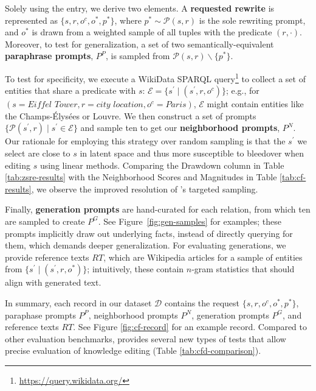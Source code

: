 Solely using the \pararel entry, we derive two elements. A \textbf{requested rewrite} is represented as $\{s, r, o^c, o^*, p^* \}$, where $p^* \sim\mathcal{P}(s, r)$ is the sole rewriting prompt, and $o^*$ is drawn from a weighted sample of all \pararel tuples with the predicate $(r, \cdot)$.
Moreover, to test for generalization, a set of two semantically-equivalent \textbf{paraphrase prompts}, $P^P$, is sampled from $\mathcal{P}(s,r) \backslash \{p^*\}$.

To test for specificity, we execute a WikiData SPARQL query\footnote{\url{https://query.wikidata.org/}} to collect a set of entities that share a predicate with $s$: $\mathcal{E} =\{ s^\prime \mid (s^\prime, r, o^c) \}$; e.g., for $(s=\textit{Eiffel Tower}, r=\textit{city location}, o^c=\textit{Paris})$, $\mathcal{E}$ might contain entities like the Champs-Élysées or Louvre. We then construct a set of prompts $\{\mathcal{P}(s^\prime, r) \mid s^\prime \in \mathcal{E}\}$ and sample ten to get our \textbf{neighborhood prompts}, $P^N$. Our rationale for employing this strategy over random sampling is that the $s^\prime$ we select are close to $s$ in latent space and thus more susceptible to bleedover when editing $s$ using linear methods. Comparing the Drawdown column in Table \ref{tab:zsre-results} with the Neighborhood Scores and Magnitudes in Table \ref{tab:cf-results}, we observe the improved resolution of \cfd's targeted sampling.


Finally, \textbf{generation prompts} are hand-curated for each relation, from which ten are sampled to create $P^G$. See Figure~\ref{fig:gen-samples} for examples; these prompts implicitly draw out underlying facts, instead of directly querying for them, which demands deeper generalization. For evaluating generations, we provide reference texts $RT$, which are Wikipedia articles for a sample of entities from $\{s^\prime \mid (s^\prime, r, o^*) \}$; intuitively, these contain $n$-gram statistics that should align with generated text.

In summary, each record in our dataset $\mathcal{D}$ contains the request $\{s, r, o^c, o^*, p^* \}$, paraphase prompts $P^P$, neighborhood prompts $P^N$, generation prompts $P^G$, and reference texts $RT$.
See Figure \ref{fig:cf-record} for an example record.
Compared to other evaluation benchmarks, \cfd provides several new types of tests that allow precise evaluation of knowledge editing (Table \ref{tab:cfd-comparison}).




